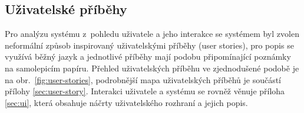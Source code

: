 \documentclass[twoside]{ctuthesis}
\begin{document}
\begin{enumerate}[label=\textbf{O\arabic*.}]
\newpage
\section{Uživatelské příběhy}\label{uc-analysis}

Pro analýzu systému z~pohledu uživatele a jeho interakce se systémem byl zvolen neformální způsob inspirovaný uživatelskými příběhy (user stories), pro popis se využívá běžný jazyk a jednotlivé příběhy mají podobu připomínající poznámky na samolepicím papíru. Přehled uživatelských příběhu ve zjednodušené podobě je na obr.~\ref{fig:user-stories}, podrobnější mapa uživatelských příběhů je součástí přílohy \ref{sec:user-story}. Interakci uživatele a systému se rovněž věnuje příloha \ref{sec:ui}, která obsahuje náčrty uživatelského rozhraní a jejich popis.
%





\end{enumerate}
\end{document}
